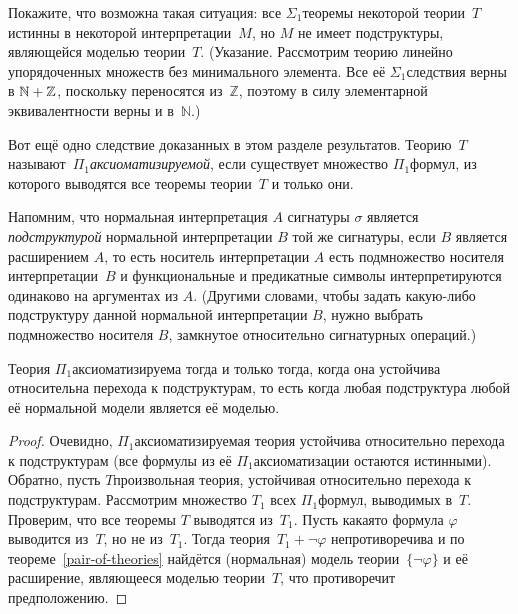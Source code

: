 \begin{problem}
Покажите, что возможна такая ситуация: все $\Sigma_1$\д теоремы
некоторой теории~$T$ истинны в некоторой интерпретации~$M$, но
$M$ не имеет подструктуры, являющейся моделью теории~$T$.
(Указание. Рассмотрим теорию линейно упорядоченных множеств без
минимального элемента. Все её $\Sigma_1$\д следствия верны в
$\mathbb{N}\hm+\mathbb{Z}$, поскольку переносятся
из~$\mathbb{Z}$, поэтому в силу элементарной эквивалентности
верны и в~$\mathbb{N}$.)
\end{problem}

Вот ещё одно следствие доказанных в этом разделе результатов.
Теорию~$T$ называют~\emph{$\Pi_1$\д аксиоматизируемой},%
%
если существует множество $\Pi_1$\д формул, из которого
выводятся все теоремы теории~$T$ и только они.

Напомним, что нормальная интерпретация $A$ сигнатуры $\sigma$
является \emph{подструктурой} нормальной интерпретации $B$ той
же сигнатуры, если $B$ является расширением $A$, то есть
носитель интерпретации $A$ есть подмножество носителя
интерпретации~$B$ и функциональные и предикатные символы
интерпретируются одинаково на аргументах из $A$.
(Другими словами, чтобы задать какую-либо подструктуру данной
нормальной интерпретации $B$, нужно выбрать подмножество
носителя $B$, замкнутое относительно сигнатурных операций.)

\begin{theorem}
%
%
%
Теория $\Pi_1$\д аксиоматизируема тогда и только тогда, когда
она устойчива относительна перехода к подструктурам, то есть
когда любая подструктура любой её нормальной модели является её
моделью.
\end{theorem}

\begin{proof}
Очевидно, $\Pi_1$\д аксиоматизируемая теория устойчива
относительно перехода к подструктурам (все формулы из её
$\Pi_1$\д аксиоматизации остаются истинными). Об\-рат\-но, пусть
$T$\т произвольная теория, устойчивая относительно перехода к
подструктурам. Рассмотрим множество $T_1$ всех $\Pi_1$\д формул,
выводимых в~$T$. Проверим, что все теоремы $T$ выводятся
из~$T_1$. Пусть какая\д то формула $\varphi$ выводится из~$T$,
но не из~$T_1$. Тогда теория~$T_1+\lnot\varphi$ непротиворечива
и по теореме~\ref{pair-of-theories} найдётся (нормальная) модель
теории~$\{\lnot\varphi\}$ и её расширение, являющееся моделью
теории~$T$, что противоречит предположению.
\end{proof}

